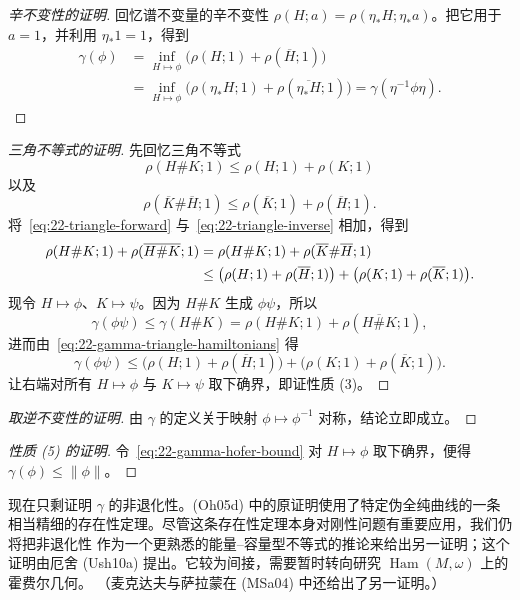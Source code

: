 \begin{proof}[辛不变性的证明]
回忆谱不变量的辛不变性
$\rho(H;a)=\rho(\eta_*H;\eta_*a)$。把它用于 $a=1$，并利用
$\eta_*1=1$，得到
\[
 \begin{aligned}
 \gamma(\phi)
 &=\inf_{H\mapsto\phi}\bigl(\rho(H;1)+\rho(\overline H;1)\bigr)\\
 &=\inf_{H\mapsto\phi}
 \bigl(\rho(\eta_*H;1)+\rho(\overline{\eta_*H};1)\bigr)
 =\gamma(\eta^{-1}\phi\eta).
 \end{aligned}
\]
\end{proof}

\begin{proof}[三角不等式的证明]
先回忆三角不等式
\begin{equation}
 \rho(H\#K;1)\leq\rho(H;1)+\rho(K;1)
 \label{eq:22-triangle-forward}
\end{equation}
以及
\begin{equation}
 \rho(\overline K\#\overline H;1)
 \leq\rho(\overline K;1)+\rho(\overline H;1).
 \label{eq:22-triangle-inverse}
\end{equation}
将~\eqref{eq:22-triangle-forward} 与~\eqref{eq:22-triangle-inverse} 相加，得到
\begin{align}
 \rho(H\#K;1)+\rho(\overline{H\#K};1)
 &=\rho(H\#K;1)+\rho(\overline K\#\overline H;1)\notag\\
 &\leq\bigl(\rho(H;1)+\rho(\overline H;1)\bigr)
 +\bigl(\rho(K;1)+\rho(\overline K;1)\bigr).
 \label{eq:22-gamma-triangle-hamiltonians}
\end{align}
现令 $H\mapsto\phi$、$K\mapsto\psi$。因为 $H\#K$ 生成 $\phi\psi$，所以
\[
 \gamma(\phi\psi)\leq\gamma(H\#K)
 =\rho(H\#K;1)+\rho(\overline{H\#K};1),
\]
进而由~\eqref{eq:22-gamma-triangle-hamiltonians} 得
\[
 \gamma(\phi\psi)\leq
 \bigl(\rho(H;1)+\rho(\overline H;1)\bigr)
 +\bigl(\rho(K;1)+\rho(\overline K;1)\bigr).
\]
让右端对所有 $H\mapsto\phi$ 与 $K\mapsto\psi$ 取下确界，即证性质 (3)。
\end{proof}

\begin{proof}[取逆不变性的证明]
由 $\gamma$ 的定义关于映射 $\phi\mapsto\phi^{-1}$ 对称，结论立即成立。
\end{proof}

\begin{proof}[性质 (5) 的证明]
令~\eqref{eq:22-gamma-hofer-bound} 对 $H\mapsto\phi$ 取下确界，便得
$\gamma(\phi)\leq\lVert\phi\rVert$。
\end{proof}

现在只剩证明 $\gamma$ 的非退化性。(Oh05d) 中的原证明使用了特定伪全纯曲线的一条
相当精细的存在性定理。尽管这条存在性定理本身对刚性问题有重要应用，我们仍将把非退化性
作为一个更熟悉的能量--容量型不等式的推论来给出另一证明；这个证明由厄舍 (Ush10a)
提出。它较为间接，需要暂时转向研究 $\operatorname{Ham}(M,\omega)$ 上的霍费尔几何。
（麦克达夫与萨拉蒙在 (MSa04) 中还给出了另一证明。）

